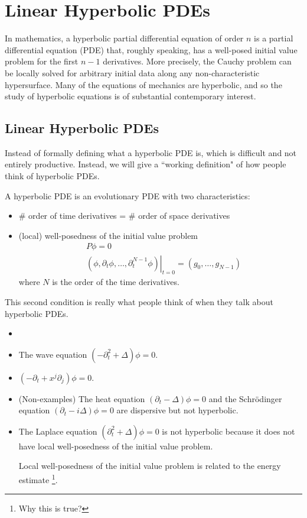 \newpage 
\chapter{Linear Hyperbolic PDEs}
In mathematics, a hyperbolic partial differential equation of order $n$ is a partial differential equation (PDE) that, roughly speaking, has a well-posed initial value problem for the first $n-1$ derivatives. More precisely, the Cauchy problem can be locally solved for arbitrary initial data along any non-characteristic hypersurface. Many of the equations of mechanics are hyperbolic, and so the study of hyperbolic equations is of substantial contemporary interest. 

\section{Linear Hyperbolic PDEs}
Instead of formally defining what a hyperbolic PDE is, which is difficult and not entirely productive. Instead, we will give a ``working definition" of how people think of hyperbolic PDEs.
\begin{definition}
 A hyperbolic PDE is an evolutionary PDE with two characteristics:
\begin{itemize}
    \item \# order of time derivatives = \# order of space derivatives 
    \item (local) well-posedness of the initial value problem
    \[
        \begin{aligned}
            &P \phi=0 \\
            &\left.\left(\phi, \partial_{t} \phi, \ldots, \partial_{t}^{N-1} \phi\right)\right|_{t=0}=\left(g_{0}, \ldots, g_{N-1}\right)
            \end{aligned}
    \]
    where $N$ is the order of the time derivatives. 
\end{itemize}
\end{definition}
This second condition is really what people think of when they talk about hyperbolic PDEs. 

\begin{example}
\begin{itemize}
    \item []
    \item The wave equation $\left(-\partial_{t}^{2}+\Delta\right) \phi=0$. 
    \item $\left(-\partial_{t}+x^{j} \partial_{j}\right) \phi=0$.
    \item (Non-examples) The heat equation $\left(\partial_{t}-\Delta\right) \phi=0$ and the Schrödinger equation $\left(\partial_{t}-i \Delta\right) \phi=0$ are dispersive but not hyperbolic.
    \item The Laplace equation $\left(\partial_{t}^{2}+\Delta\right) \phi=0$ is not hyperbolic because it does not have local well-posedness of the initial value problem.
    
    Local well-posedness of the initial value problem is related to the energy estimate \footnote{Why this is true?}.
\end{itemize}

\end{example}

